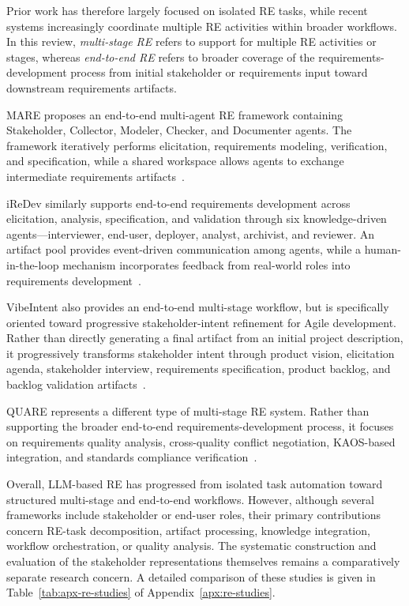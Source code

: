 Prior work has therefore largely focused on isolated RE tasks, while recent systems increasingly coordinate multiple RE activities within broader workflows. In this review, \emph{multi-stage RE} refers to support for multiple RE activities or stages, whereas \emph{end-to-end RE} refers to broader coverage of the requirements-development process from initial stakeholder or requirements input toward downstream requirements artifacts.

MARE proposes an end-to-end multi-agent RE framework containing Stakeholder, Collector, Modeler, Checker, and Documenter agents. The framework iteratively performs elicitation, requirements modeling, verification, and specification, while a shared workspace allows agents to exchange intermediate requirements artifacts~\cite{mare2024}.

iReDev similarly supports end-to-end requirements development across elicitation, analysis, specification, and validation through six knowledge-driven agents---interviewer, end-user, deployer, analyst, archivist, and reviewer. An artifact pool provides event-driven communication among agents, while a human-in-the-loop mechanism incorporates feedback from real-world roles into requirements development~\cite{jin2025iredev}.

VibeIntent also provides an end-to-end multi-stage workflow, but is specifically oriented toward progressive stakeholder-intent refinement for Agile development. Rather than directly generating a final artifact from an initial project description, it progressively transforms stakeholder intent through product vision, elicitation agenda, stakeholder interview, requirements specification, product backlog, and backlog validation artifacts~\cite{vibeintent2026}.

QUARE represents a different type of multi-stage RE system. Rather than supporting the broader end-to-end requirements-development process, it focuses on requirements quality analysis, cross-quality conflict negotiation, KAOS-based integration, and standards compliance verification~\cite{cheng2026quare}.

Overall, LLM-based RE has progressed from isolated task automation toward structured multi-stage and end-to-end workflows. However, although several frameworks include stakeholder or end-user roles, their primary contributions concern RE-task decomposition, artifact processing, knowledge integration, workflow orchestration, or quality analysis. The systematic construction and evaluation of the stakeholder representations themselves remains a comparatively separate research concern. A detailed comparison of these studies is given in Table~\ref{tab:apx-re-studies} of Appendix~\ref{apx:re-studies}.

